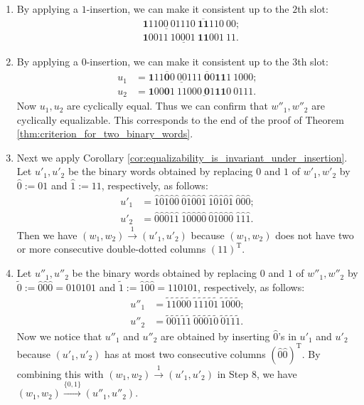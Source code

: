 \documentclass{article}
\theoremstyle{definition}
\newcommand{\insto}[1]{\overset{{#1}}{\to}}
\begin{document}
\begin{enumerate}
\[\begin{split}
            &\mathbf{1}00\underline{11\ 1000}1\ 00111.
        \end{split}
    \]
    \item By applying a $1$-insertion, we can make it consistent up to the $2$th slot:
    \[
        \begin{split}
            &\underline{\mathbf{1}1100\ 0111}0\ \overline{\mathbf{11}}110\ 00;\\
            &\mathbf{1}00\underline{11\ 10001\ \mathbf{11}}001\ 11.
        \end{split}
    \]
    \item By applying a $0$-insertion, we can make it consistent up to the $3$th slot:
    \[
        \begin{split}
            u_1 &= \underline{\mathbf{1}11\overline{\mathbf{0}}0\ 00111\ \overline{\mathbf{0}}0}\mathbf{11}1\ 1000; \\
            u_2 &= \mathbf{1}00\mathbf{0}\underline{1\ 11000\ \mathbf{0}1\mathbf{11}0\ 0}111.
        \end{split}
    \]
    Now $u_1, u_2$ are cyclically equal. Thus we can confirm that $w''_1, w''_2$ are cyclically equalizable. This corresponds to the end of the proof of Theorem \ref{thm:criterion_for_two_binary_words}.
    \item Next we apply Corollary \ref{cor:equalizability_is_invariant_under_insertion}. 
    Let $u'_1, u'_2$ be the binary words obtained by replacing $0$ and $1$ of $w'_1, w'_2$ by $\hat{0} := 01$ and $\hat{1} := 11$, respectively, as follows:
    \[
        \begin{split}
            u'_1 &= \hat{1}\hat{0}\hat{1}\hat{0}\hat{0}\ \hat{0}\hat{1}\hat{0}\hat{0}\hat{1}\ \hat{1}\hat{0}\hat{1}\hat{0}\hat{1}\ \hat{0}\hat{0}\hat{0}; \\
            u'_2 &= \hat{0}\hat{0}\hat{0}\hat{1}\hat{1}\ \hat{1}\hat{0}\hat{0}\hat{0}\hat{0}\ \hat{0}\hat{1}\hat{0}\hat{0}\hat{0}\ \hat{1}\hat{1}\hat{1}.
        \end{split}
    \]
    Then we have $(w_1,w_2) \insto{1} (u'_1, u'_2)$ because $(w_1,w_2)$ does not have two or more consecutive double-dotted columns $(11)^{\mathrm{T}}$.
    \item Let $u''_1, u''_2$ be the binary words obtained by replacing $0$ and $1$ of $w''_1, w''_2$ by $\tilde{0} := \hat{0}\hat{0}\hat{0} = 010101$ and $\tilde{1} := \hat{1}\hat{0}\hat{0} = 110101$, respectively, as follows:
    \[
        \begin{split}
            u''_1 &= \tilde{1}\tilde{1}\tilde{0}\tilde{0}\tilde{0}\ \tilde{1}\tilde{1}\tilde{1}\tilde{0}\tilde{1}\ \tilde{1}\tilde{0}\tilde{0}\tilde{0}; \\
            u''_2 &= \tilde{0}\tilde{0}\tilde{1}\tilde{1}\tilde{1}\ \tilde{0}\tilde{0}\tilde{0}\tilde{1}\tilde{0}\ \tilde{0}\tilde{1}\tilde{1}\tilde{1}.
        \end{split}
    \]
    Now we notice that $u''_1$ and $u''_2$ are obtained by inserting $\hat{0}$'s in $u'_1$ and $u'_2$ because $(u'_1,u'_2)$ has at most two consecutive columns $(\hat{0}\hat{0})^{\mathrm{T}}$. By combining this with $(w_1,w_2) \insto{1} (u'_1, u'_2)$ in Step 8, we have $(w_1,w_2) \xrightarrow{\{0,1\}} (u''_1,u''_2)$. 


\end{enumerate}
\end{document}
